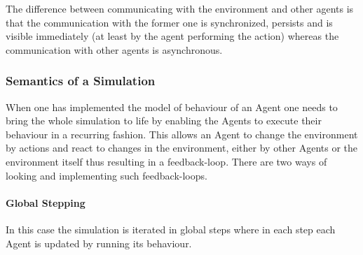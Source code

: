 The difference between communicating with the environment and other agents is that the communication with the former one is synchronized, persists and is visible immediately (at least by the agent performing the action) whereas the communication with other agents is asynchronous.

\subsubsection{Semantics of a Simulation}
When one has implemented the model of behaviour of an Agent one needs to bring the whole simulation to life by enabling the Agents to execute their behaviour in a recurring fashion. This allows an Agent to change the environment by actions and react to changes in the environment, either by other Agents or the environment itself thus resulting in a feedback-loop. There are two ways of looking and implementing such feedback-loops. 

\paragraph{Global Stepping}
In this case the simulation is iterated in global steps where in each step each Agent is updated by running its behaviour.


